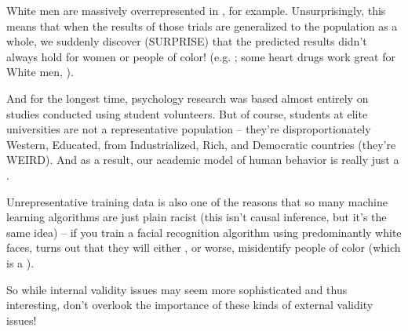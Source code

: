 \documentclass[letterpaper,10pt,english]{jupyterBook}
\begin{document}
\sphinxAtStartPar
White men are massively over\sphinxhyphen{}represented in , for example. Unsurprisingly, this means that when the results of those trials are generalized to the population as a whole, we suddenly discover (SURPRISE) that the predicted results didn’t always hold for women or people of color! (e.g. ; some heart drugs work great for White men, ).

\sphinxAtStartPar
And for the longest time, psychology research was based almost entirely on studies conducted using student volunteers. But of course, students at elite universities are not a representative population – they’re disproportionately Western, Educated, from Industrialized, Rich, and Democratic countries (they’re WEIRD). And as a result, our academic model of human behavior is really just a .

\sphinxAtStartPar
Unrepresentative training data is also one of the reasons that so many machine learning algorithms are just plain racist (this isn’t causal inference, but it’s the same idea) – if you train a facial recognition algorithm using predominantly white faces, turns out that they will either , or worse, mis\sphinxhyphen{}identify people of color (which is a ).

\sphinxAtStartPar
So while internal validity issues may seem more sophisticated and thus interesting, don’t overlook the importance of these kinds of external validity issues!

\sphinxAtStartPar
{}
\end{document}

